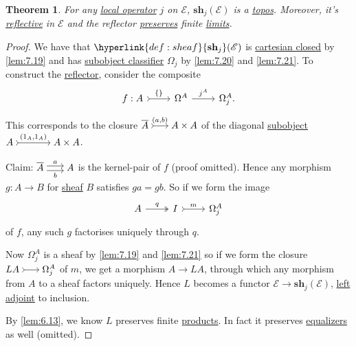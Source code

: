 \documentclass{article}
\newcommand{\sh}{\mathbf{sh}}
\newcommand{\ec}{\mathscr{E}}
\newenvironment{tikzcdi}{\begin{tikzcd}[cramped, sep=scriptsize]}{\end{tikzcd}}
\let\to\longrightarrow
\newtheorem{nthm}{Theorem}[section]
\begin{document}
\begin{nthm}\label{thm:7.22}
  For any \hyperlink{def:lop}{local operator} $j$ on $\ec$, $\sh_j(\ec)$ is a \hyperlink{def:topos}{topos}.
  Moreover, it's \hyperlink{def:refl}{reflective} in $\ec$ and the reflector \hyperlink{def:plim}{preserves} finite \hyperlink{def:limit}{limits}.
\end{nthm}
\begin{proof}
  We have that $\hyperlink{def:sheaf}{\sh_j}(\ec)$ is \hyperlink{def:cc}{cartesian closed} by \cref{lem:7.19} and has \hyperlink{def:sc}{subobject classifier} $\Omega_j$ by \cref{lem:7.20} and \cref{lem:7.21}.
  To construct the \hyperlink{def:refl}{reflector}, consider the composite
  \begin{equation*}
    \begin{tikzcd}
      f: A \rar[tail]{\{\}} & \Omega^A \rar{j^A} &\Omega_j^A.
    \end{tikzcd}
  \end{equation*}
  This corresponds to the closure $\begin{tikzcdi}\overline{A} \rar[tail]{(a,b)} & A \times A\end{tikzcdi}$ of the diagonal \hyperlink{def:subobj}{subobject} $\begin{tikzcd}[cramped, row sep=scriptsize, column sep=large]A \rar[tail]{(1_A, 1_A)} & A \times A\end{tikzcd}$.

  Claim: $\begin{tikzcdi}\overline{A} \rar[shift left]{a} \rar[shift right,']{b} & A\end{tikzcdi}$ is the kernel-pair of $f$ (proof omitted).
  Hence any morphism $g: A \to B$ for \hyperlink{def:sheaf}{sheaf} $B$ satisfies $ga = gb$.
  So if we form the image
  \begin{equation*}
    \begin{tikzcd}
      A \rar[two heads]{q} & I \rar[tail]{m} & \Omega_j^A
    \end{tikzcd}
  \end{equation*}
  of $f$, any such $g$ factorises uniquely through $q$.

  Now $\Omega_j^A$ is a sheaf by \cref{lem:7.19} and \cref{lem:7.21} so if we form the closure $\begin{tikzcdi} LA \rar[tail] & \Omega_j^A \end{tikzcdi}$ of $m$, we get a morphism $A \to LA$, through which any morphism from $A$ to a sheaf factors uniquely.
  Hence $L$ becomes a functor $\ec \to \sh_j(\ec)$, \hyperlink{def:adj}{left adjoint} to inclusion.

  By \cref{lem:6.13}, we know $L$ preserves finite \hyperlink{def:lprod}{products}.
  In fact it preserves \hyperlink{def:equalizer}{equalizers} as well (omitted).
\end{proof}
\end{document}
